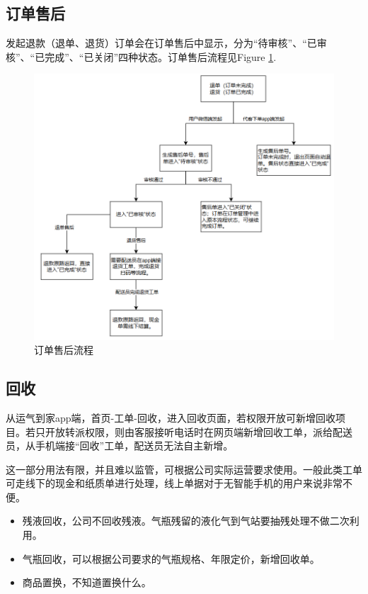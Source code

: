 \documentclass[UTF8]{ctexart}
\begin{document}
\subsection{订单售后}

发起退款（退单、退货）订单会在订单售后中显示，分为“待审核”、“已审核”、“已完成”、“已关闭”四种状态。订单售后流程见Figure \ref{fig:chargeback}.

\begin{figure}[h]
	\centering
	\includegraphics[width=1\linewidth]{dlh_tutorial_figs/chargeback}
	\caption{订单售后流程}
	\label{fig:chargeback}
\end{figure}


\subsection{回收}

从运气到家app端，首页-工单-回收，进入回收页面，若权限开放可新增回收项目。若只开放转派权限，则由客服接听电话时在网页端新增回收工单，派给配送员，从手机端接“回收”工单，配送员无法自主新增。

这一部分用法有限，并且难以监管，可根据公司实际运营要求使用。一般此类工单可走线下的现金和纸质单进行处理，线上单据对于无智能手机的用户来说非常不便。

\begin{itemize}
	
	\item 残液回收，公司不回收残液。气瓶残留的液化气到气站要抽残处理不做二次利用。
	
	\item 气瓶回收，可以根据公司要求的气瓶规格、年限定价，新增回收单。
	
	\item 商品置换，不知道置换什么。
	
\end{itemize}
\end{document}
